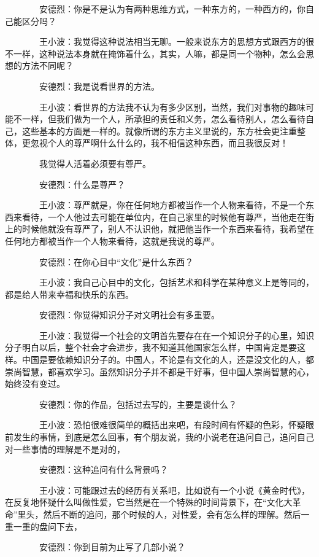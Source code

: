 　　　　安德烈：你是不是认为有两种思维方式，一种东方的，一种西方的，你自己能区分吗？ 

　　　　王小波：我觉得这种说法相当无聊。一般来说东方的思想方式跟西方的很不一样，这种说法本身就在掩饰着什么，其实，人嘛，都是同一个物种，怎么会思想的方法不同呢？ 

　　　　安德烈：我是说看世界的方法。 

　　　　王小波：看世界的方法我不认为有多少区别，当然，我们对事物的趣味可能不一样，但我们做为一个人，所承担的责任和义务，怎么看待别人，怎么看待自己，这些基本的方面是一样的。就像所谓的东方主义里说的，东方社会更注重整体，更忽视个人的尊严啊什么什么的，我不相信这种东西，而且我很反对！ 

　　　　我觉得人活着必须要有尊严。 

　　　　安德烈：什么是尊严？ 

　　　　王小波：尊严就是，你在任何地方都被当作一个人物来看待，不是一个东西来看待，一个人他过去可能在单位内，在自己家里的时候他有尊严，当他走在街上的时候他就没有尊严了，别人不认识他，就把他当作一个东西来看待，我希望在任何地方都被当作一个人物来看待，这就是我说的尊严。 

　　　　安德烈：在你心目中“文化”是什么东西？ 

　　　　王小波：我自己心目中的文化，包括艺术和科学在某种意义上是等同的，都是给人带来幸福和快乐的东西。 

　　　　安德烈：你觉得知识分子对文明社会有多重要。 

　　　　王小波：我觉得一个社会的文明首先要存在在一个知识分子的心里，知识分子明白以后，整个社会才会进步，我不知道其他国家怎么样，中国肯定是要这样。中国是要依赖知识分子的。中国人，不论是有文化的人，还是没文化的人，都崇尚智慧，都喜欢学习。虽然知识分子并不都是干好事，但中国人崇尚智慧的心，始终没有变过。 

　　　　安德烈：你的作品，包括过去写的，主要是谈什么？ 

　　　　王小波：恐怕很难很简单的概括出来吧，有段时间有怀疑的色彩，怀疑眼前发生的事情，到底是怎么回事，有个朋友说，我的小说老在追问自己，追问自己对一些事情的理解是不是对的， 

　　　　安德烈：这种追问有什么背景吗？ 

　　　　王小波：可能跟过去的经历有关系吧，比如说有一个小说《黄金时代》，在反复地怀疑什么叫做性爱，它当然是在一个特殊的时间背景下，在“文化大革命”里头，然后不断的追问，那个时候的人，对性爱，会有怎么样的理解。然后一重一重的盘问下去， 

　　　　安德烈：你到目前为止写了几部小说？ 

